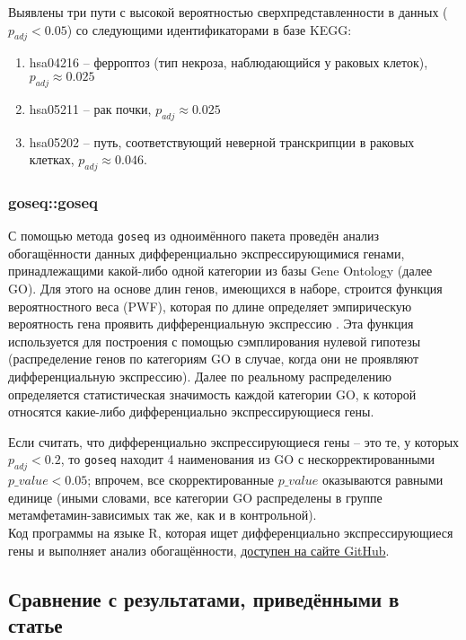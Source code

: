\documentclass[a4paper,12pt]{article}
\begin{document}
Выявлены три пути с высокой вероятностью сверхпредставленности в данных ($ p_{adj} < 0.05 $) со следующими идентификаторами в базе KEGG:
\begin{enumerate}[noitemsep]
    \item hsa04216 -- ферроптоз (тип некроза, наблюдающийся у раковых клеток), $ p_{adj} \approx 0.025 $
    \item hsa05211 -- рак почки, $ p_{adj} \approx 0.025 $
    \item hsa05202 -- путь, соответствующий неверной транскрипции в раковых клетках, $ p_{adj} \approx 0.046 $.
\end{enumerate}


\subsubsection{goseq::goseq}

С помощью метода \texttt{goseq} из одноимённого пакета проведён анализ обогащённости данных дифференциально экспрессирующимися генами, принадлежащими какой-либо одной категории из базы Gene Ontology (далее GO).
Для этого на основе длин генов, имеющихся в наборе, строится функция вероятностного веса (PWF), которая по длине определяет эмпирическую вероятность гена проявить дифференциальную экспрессию \cite{young2010}.
Эта функция используется для построения с помощью сэмплирования нулевой гипотезы (распределение генов по категориям GO в случае, когда они не проявляют дифференциальную экспрессию).
Далее по реальному распределению определяется статистическая значимость каждой категории GO, к которой относятся какие-либо дифференциально экспрессирующиеся гены.

Если считать, что дифференциально экспрессирующиеся гены -- это те, у которых $ p_{adj} < 0.2 $, то \texttt{goseq} находит 4 наименования из GO с нескорректированными $ p\_value < 0.05 $; впрочем, все скорректированные $p\_value$ оказываются равными единице (иными словами, все категории GO распределены в группе метамфетамин-зависимых так же, как и в контрольной). \\

Код программы на языке R, которая ищет дифференциально экспрессирующиеся гены и выполняет анализ обогащённости, \href{https://github.com/zuevval/source/tree/master/r/bioinf2021/lab2rna_seq}{доступен на сайте GitHub}.

\subsection{Сравнение с результатами, приведёнными в статье}
\end{document}
